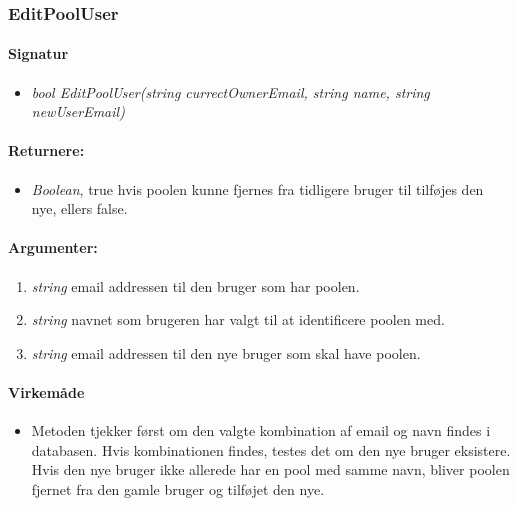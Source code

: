 \subsubsection{EditPoolUser}%







\paragraph{Signatur}
\begin{itemize}
	\item \textit{bool EditPoolUser(string currectOwnerEmail, string name, string newUserEmail)}
\end{itemize}

\paragraph{Returnere:}
\begin{itemize}
	\item \textit{Boolean}, true hvis poolen kunne fjernes fra tidligere bruger til tilføjes den nye, ellers false.
\end{itemize}

\paragraph{Argumenter:}
\begin{enumerate}
	\item \textit{string} email addressen til den bruger som har poolen.
	\item \textit{string} navnet som brugeren har valgt til at identificere poolen med.
	\item \textit{string} email addressen til den nye bruger som skal have poolen.
\end{enumerate}

\paragraph{Virkemåde}
\begin{itemize}
	\item Metoden tjekker først om den valgte kombination af email og navn findes i databasen. Hvis kombinationen findes, testes det om den nye bruger eksistere. Hvis den nye bruger ikke allerede har en pool med samme navn, bliver poolen fjernet fra den gamle bruger og tilføjet den nye.
\end{itemize}






